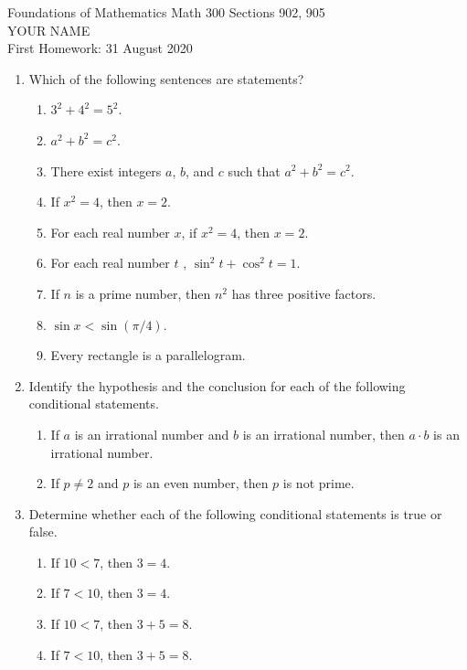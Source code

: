 \documentclass[12pt]{article}
\begin{document}
\LARGE 
\noindent
{\color{Maroon}Foundations of Mathematics \hfill Math 300 Sections 902, 905}\vspace{2pt}\\
\Large YOUR NAME\vspace{2pt}\\
\large
First Homework: \hfill 31 August 2020
\normalsize\vspace{10pt}


\begin{enumerate}


\item Which of the following sentences are statements?
  \begin{enumerate}
   \item $3^2+4^2=5^2$.
   \item $a^2+b^2=c^2$.
   \item There exist integers $a$, $b$, and $c$ such that  $ a^2+b^2=c^2$.
   \item If $x^2= 4$, then $x=2$.
   \item For each real number $x$,  if $x^2= 4$, then $x=2$.
   \item For each real number $t$ , $\sin^2 t + \cos^2 t =1$.
   \item If $n$ is a prime number, then $n^2$ has three positive factors.
   \item $\sin x < \sin(\pi/4)$.
   \item Every rectangle is a parallelogram.
  \end{enumerate}

 \item  Identify the hypothesis and the conclusion for each of the following conditional statements.
  \begin{enumerate}
   \item If $a$ is an irrational number and $b$ is an irrational number, then $a\cdot b$ is an irrational number.
   \item If $p \neq 2$ and $p$ is an even number, then $p$ is not prime.
  \end{enumerate}

 \item   Determine whether each of the following conditional statements is true or false.
  \begin{enumerate}
   \item  If $10 < 7$, then $3 = 4$.
   \item If $7 < 10$, then $3 = 4$.
   \item If $10 < 7$, then $3 + 5 = 8$.
   \item If $7 < 10$, then $3 + 5 = 8$.


\end{enumerate}
\end{enumerate}
\end{document}
